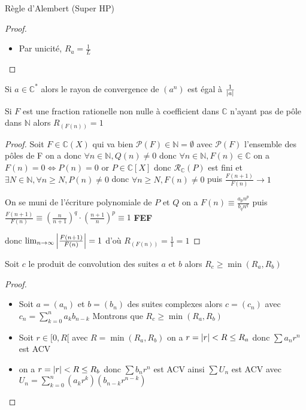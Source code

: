 \documentclass[11pt,hidelinks]{book}
\theoremstyle{mytheoremstyle}
\theoremstyle{mytheoremstyle}
\theoremstyle{mytheoremstyle}
\theoremstyle{mytheoremstyle}
\theoremstyle{mytheoremstyle}
\theoremstyle{mytheoremstyle}
\theoremstyle{mytheoremstyle}
\theoremstyle{mytheoremstyle}
\theoremstyle{myproblemstyle}
\def\mbb#1{\mathbb{#1}}
\def\mfc#1{\mathcal{#1}}
\def\bN{\mbb{N}}
\def\bC{\mbb{C}}
\def\fn{\forall n \in \bN,}
\def\fef{\textbf{FEF}}
\def\ln{\lim_{n \to \infty}}
\newcommand{\parenth}[1]{\left(#1\right)}
\begin{document}
\begin{adjustwidth}{-2em}{-1em}
\begin{prop}{Règle d'Alembert (Super HP)}
\begin{proof}
\begin{itemize}[label=$\cdot$]
            
            \item Par unicité, $R_a = \frac{1}{L}$
            \end{itemize}
        \end{proof}
    \end{prop}
    \begin{prop}
        Si $a \in \bC^*$ alors le rayon de convergence de $(a^n)$ est égal à $\frac{1}{\abs{a}}$ 
    \end{prop}
    \begin{prop}
        Si $F$ est une fraction rationelle non nulle à coefficient dans $\bC$ n'ayant pas de pôle dans $\bN$ alors $R_{(F(n))} = 1$
        \begin{proof}
            Soit $F \in \bC(X)$ qui va bien $\mfc{P}(F) \in \bN = \emptyset$ avec $\mfc{P}(F)$ l'ensemble des pôles de F
            on a donc $\fn Q(n) \not= 0$ donc $\fn F(n) \in \bC$ 
            on a $F(n) = 0 \Leftrightarrow P(n) = 0$ 
            or $P \in \bC[X]$ donc $\mfc{R}_{\bC} (P)$ est fini 
            et $\exists N \in \bN, \forall n \geq N, P(n) \not= 0$
            donc $\forall n \geq N, F(n) \not= 0$ 
            puis $\frac{F(n+1)}{F(n)} \to 1$
            \begin{ef}
                On se muni de l'écriture polynomiale de $P$ et $Q$
                on a $F(n) \equiv \frac{a_p n^p}{b_q n^q}$
                puis $\frac{F(n+1)}{F(n)} \equiv \parenth{\frac{n}{n+1}}^q \cdot \parenth{\frac{n+1}{n}}^p \equiv 1$
                \fef
            \end{ef}
            donc $\ln \abs{\frac{F(n+1)}{F(n)}} = 1$ d'où $R_{(F(n))} = \frac{1}{1} = 1$
        \end{proof}
    \end{prop}
    \begin{prop}
        Soit $c$ le produit de convolution des suites $a$ et $b$ alors $R_c \geq \min(R_a,R_b)$
        \begin{proof}
            \begin{itemize}[label=$\cdot$]
            \item Soit $a = (a_n)$ et $b = (b_n)$ des suites complexes
            alors $c = (c_n)$ avec $c_n = \sum_{k=0}^n a_k b_{n-k}$ 
            Montrons que $R_c \geq \min(R_a, R_b)$ 
             
            \item Soit $r \in [0, R[$ avec $R = \min(R_a, R_b)$ 
            on a $r = \abs{r} < R \leq R_a$ donc $\sum a_n r^n$ est ACV 
            \item on a $r = \abs{r} < R \leq R_b$ donc $\sum b_n r^n$ est ACV 
            ainsi $\sum U_n$ est ACV avec $U_n = \sum_{k=0}^n (a_k r^k)(b_{n-k} r^{n-k})$ 
             

\end{itemize}
\end{proof}
\end{prop}
\end{adjustwidth}
\end{document}
